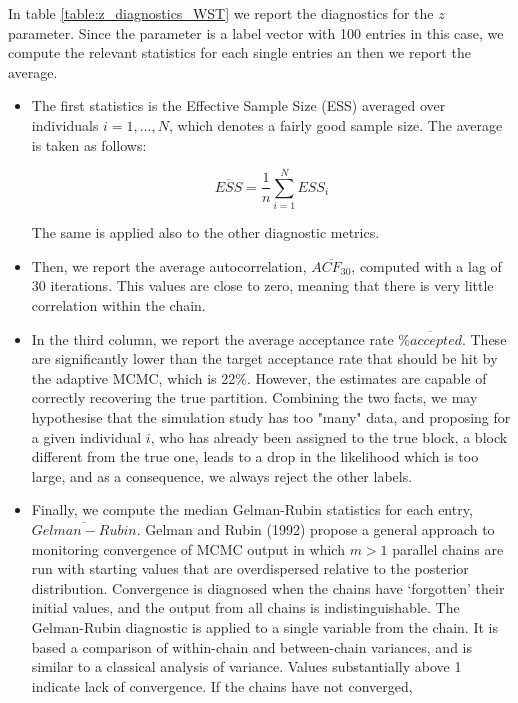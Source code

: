 \documentclass[11pt]{amsart}
\begin{document}
In table \eqref{table:z_diagnostics_WST} we report the diagnostics for the $z$ parameter. Since the parameter is a label vector with 100 entries in this case, we compute the relevant statistics for each single entries an then we report the average.
\begin{itemize}

\item The first statistics is the Effective Sample Size (ESS) averaged over individuals $i=1,\dots,N$, which denotes a fairly good sample size. The average is taken as follows:

$$
\overline{ESS} = \frac{1}{n} \sum_{i=1}^N ESS_i
$$

The same is applied also to the other diagnostic metrics.

\item Then, we report the average autocorrelation, $\overline{ACF_{30}}$, computed with a lag of 30 iterations. This values are close to zero, meaning that there is very little correlation within the chain.

\item In the third column, we report the average acceptance rate $\overline{\% accepted}$. These are significantly lower than the target acceptance rate that should be hit by the adaptive MCMC, which is 22\%. However, the estimates are capable of correctly recovering the true partition. Combining the two facts, we may hypothesise that the simulation study has too "many" data, and proposing for a given individual $i$, who has already been assigned to the true block, a block different from the true one, leads to a drop in the likelihood which is too large, and as a consequence, we always reject the other labels. 

\item Finally, we compute the median Gelman-Rubin statistics for each entry, $\overline{Gelman-Rubin}$. Gelman and Rubin (1992) propose a general approach to monitoring convergence of MCMC output in which $m >1$ parallel chains are run with starting values that are overdispersed relative to the posterior distribution. Convergence is diagnosed when the chains have ‘forgotten’ their initial values, and the output from all chains is indistinguishable. The Gelman-Rubin diagnostic is applied to a single variable from the chain. It is based a comparison of within-chain and between-chain variances, and is similar to a classical analysis of variance. Values substantially above 1 indicate lack of convergence. If the chains have not converged,
\end{itemize}
\end{document}

